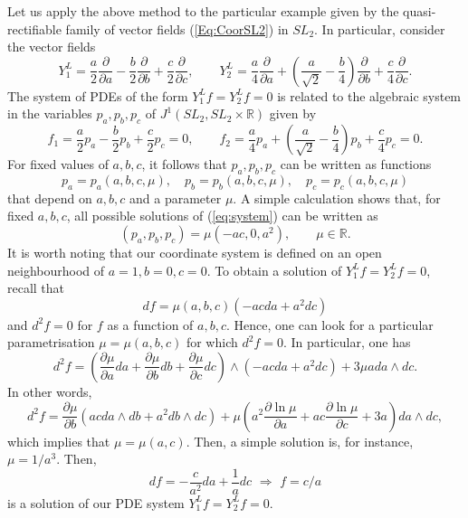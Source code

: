 \documentclass[12pt]{article}
\theoremstyle{plain}
\theoremstyle{definition}
\numberwithin{equation}{section}
\begin{document}
Let us apply the above method to the particular example given by the quasi-rectifiable family of vector fields (\ref{Eq:CoorSL2}) in $SL_2$. In particular, consider the vector fields
$$
Y_1^L=\frac a2\frac{\partial}{\partial a}-\frac b2 \frac{\partial }{\partial b}+\frac c2 \frac{\partial}{\partial c},\qquad Y_2^L=\frac a4\frac{\partial}{\partial a}+\left(\frac{a}{\sqrt{2}}-\frac b4\right)\frac{\partial}{\partial b}+\frac c4\frac{\partial}{\partial c}.
$$
The system of PDEs of the form $Y_1^Lf=Y_2^Lf=0$ is related to the algebraic system in the variables $p_a,p_b,p_c$ of $J^1(SL_2,SL_2\times \mathbb{R})$  given by
\begin{equation}\label{eq:system}
f_1=\frac a2p_a-\frac b2p_b+\frac c2p_c=0,\qquad f_2=\frac a4p_a+\left(\frac a{\sqrt{2}}-\frac b4\right)p_b+\frac c4p_c=0.
\end{equation}
For fixed values of $a,b,c$, it follows that $p_a,p_b,p_c$ can be written as functions $$p_a=p_a(a,b,c,\mu),\quad p_b=p_b(a,b,c,\mu),\quad p_c=p_c(a,b,c,\mu)$$ 
that depend on $a,b,c$ and a parameter $\mu$. A simple calculation shows that, for fixed $a,b,c$, all possible solutions of (\ref{eq:system}) can be written as
$$
(p_a,p_b,p_c)=\mu(-ac,0,a^2),\qquad \mu\in \mathbb{R}.
$$
It is worth noting that our coordinate system is defined on an open neighbourhood of $a=1,b=0, c=0$. To obtain a solution of $Y_1^Lf=Y_2^Lf=0$, recall that 
$$
df=\mu(a,b,c)(-ac da+a^2dc)
$$
and $d^2f=0$ for $f$ as a function of $a,b,c$. Hence, one can look for a particular parametrisation $\mu=\mu(a,b,c)$ for which $d^2f=0$. In particular, one has 
$$
d^2f=\left(\frac{\partial \mu}{\partial a}da+\frac{\partial \mu}{\partial b}db+\frac{\partial \mu}{\partial c}dc\right)\wedge (-acda+a^2dc)+3\mu a da
\wedge dc.
$$
In other words,
$$
d^2f=\frac{\partial \mu}{\partial b}(ac da\wedge db+a^2db\wedge dc)+\mu\left(a^2\frac{\partial \ln\mu}{\partial a}+ac \frac{\partial\ln \mu}{\partial c}+3a\right)da\wedge dc,
$$
which implies that $\mu=\mu(a,c)$. Then, a simple solution is, for instance, $\mu=1/a^3$. Then,
$$
df=-\frac{c}{a^2}da+\frac 1adc\,\,\Longrightarrow \,\,
f=c/a
$$
is a solution of our PDE system $Y_1^Lf=Y_2^Lf=0$.


\end{document}
